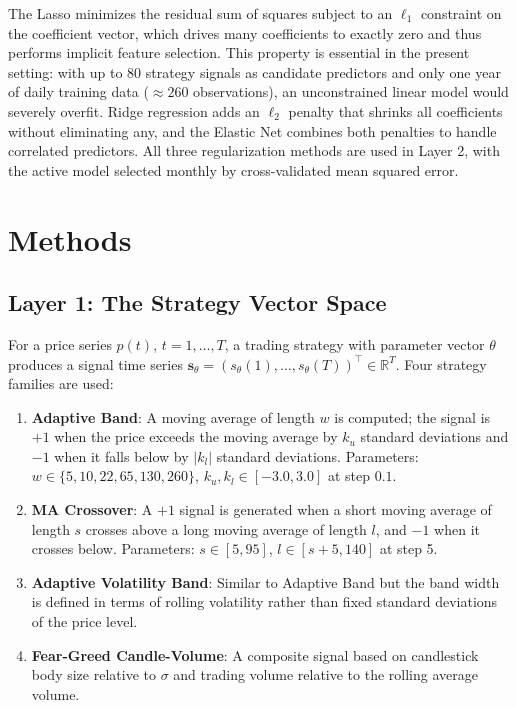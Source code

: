 \documentclass[11pt, letterpaper]{article}
\begin{document}
The Lasso \citep{tibshirani1996} minimizes the residual sum of squares subject
to an $\ell_1$ constraint on the coefficient vector, which drives many
coefficients to exactly zero and thus performs implicit feature selection.
This property is essential in the present setting: with up to 80 strategy
signals as candidate predictors and only one year of daily training data
($\approx 260$ observations), an unconstrained linear model would severely
overfit. Ridge regression adds an $\ell_2$ penalty that shrinks all
coefficients without eliminating any, and the Elastic Net combines both
penalties to handle correlated predictors. All three regularization methods
are used in Layer 2, with the active model selected monthly by
cross-validated mean squared error.

\section{Methods}

\subsection{Layer 1: The Strategy Vector Space}

For a price series $p(t)$, $t = 1, \ldots, T$, a trading strategy with
parameter vector $\theta$ produces a signal time series
$\boldsymbol{s}_\theta = (s_\theta(1), \ldots, s_\theta(T))^\top \in
\mathbb{R}^T$. Four strategy families are used:

\begin{enumerate}
\item \textbf{Adaptive Band}: A moving average of length $w$ is computed;
  the signal is $+1$ when the price exceeds the moving average by $k_u$
  standard deviations and $-1$ when it falls below by $|k_l|$ standard
  deviations. Parameters: $w \in \{5, 10, 22, 65, 130, 260\}$,
  $k_u, k_l \in [-3.0, 3.0]$ at step $0.1$.

\item \textbf{MA Crossover}: A $+1$ signal is generated when a short moving
  average of length $s$ crosses above a long moving average of length $l$,
  and $-1$ when it crosses below. Parameters: $s \in [5, 95]$,
  $l \in [s{+}5, 140]$ at step 5.

\item \textbf{Adaptive Volatility Band}: Similar to Adaptive Band but
  the band width is defined in terms of rolling volatility rather than
  fixed standard deviations of the price level.

\item \textbf{Fear-Greed Candle-Volume}: A composite signal based on
  candlestick body size relative to $\sigma$ and trading volume relative
  to the rolling average volume.
\end{enumerate}
\end{document}
